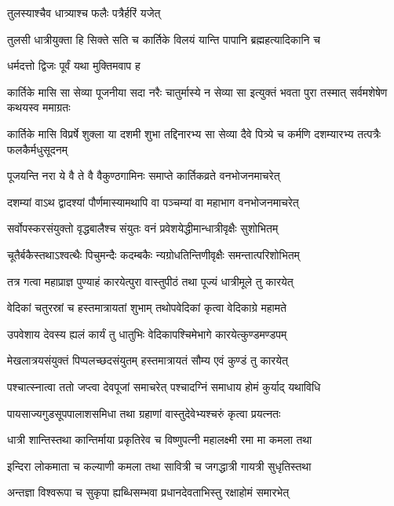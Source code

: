\onelineshloka
{तुलस्याश्चैव धात्र्याश्च फलैः पत्रैर्हरिं यजेत्} %

\twolineshloka
{तुलसी धात्रीयुक्ता हि सिक्ते सति च कार्तिके}
{विलयं यान्ति पापानि ब्रह्महत्यादिकानि च} %


\onelineshloka
{धर्मदत्तो द्विजः पूर्वं यथा मुक्तिमवाप ह} %


\threelineshloka
{कार्तिके मासि सा सेव्या पूजनीया सदा नरैः}
{चातुर्मास्ये न सेव्या सा इत्युक्तं भवता पुरा}
{तस्मात् सर्वमशेषेण कथयस्व ममाग्रतः} %


\threelineshloka
{कार्तिके मासि विप्रर्षे शुक्ला या दशमी शुभा}
{तद्दिनारभ्य सा सेव्या दैवे पित्र्ये च कर्मणि}
{दशम्यारभ्य तत्पत्रैः फलकैर्मधुसूदनम्} %

\twolineshloka
{पूजयन्ति नरा ये वै ते वै वैकुण्ठगामिनः}
{समाप्ते कार्तिकव्रते वनभोजनमाचरेत्} %

\twolineshloka
{दशम्यां वाऽथ द्वादश्यां पौर्णमास्यामथापि वा}
{पञ्चम्यां वा महाभाग वनभोजनमाचरेत्} %

\twolineshloka
{सर्वोपस्करसंयुक्तो वृद्धबालैश्च संयुतः}
{वनं प्रवेशयेद्धीमान्धात्रीवृक्षैः सुशोभितम्} %

\twolineshloka
{चूतैर्बकैस्तथाऽश्वत्थैः पिचुमन्दैः कदम्बकैः}
{न्यग्रोधतिन्तिणीवृक्षैः समन्तात्परिशोभितम्} %

\twolineshloka
{तत्र गत्वा महाप्राज्ञ पुण्याहं कारयेत्पुरा}
{वास्तुपीठं तथा पूज्यं धात्रीमूले तु कारयेत्} %

\twolineshloka
{वेदिकां चतुरस्रां च हस्तमात्रायतां शुभाम्}
{तथोपवेदिकां कृत्वा वेदिकाग्रे महामते} %

\twolineshloka
{उपवेशाय देवस्य ह्यलं कार्यं तु धातुभिः}
{वेदिकापश्चिमेभागे कारयेत्कुण्डमण्डपम्} %

\twolineshloka
{मेखलात्रयसंयुक्तं पिप्पलच्छदसंयुतम्}
{हस्तमात्रायतं सौम्य एवं कुण्डं तु कारयेत्} %

\twolineshloka
{पश्चात्स्नात्वा ततो जप्त्वा देवपूजां समाचरेत्}
{पश्चादग्निं समाधाय होमं कुर्याद् यथाविधि} %

\twolineshloka
{पायसाज्यगुडसूपपालाशसमिधा तथा}
{ग्रहाणां वास्तुदेवेभ्यश्चरुं कृत्वा प्रयत्नतः} %

\twolineshloka
{धात्री शान्तिस्तथा कान्तिर्माया प्रकृतिरेव च}
{विष्णुपत्नी महालक्ष्मी रमा मा कमला तथा} %

\twolineshloka
{इन्दिरा लोकमाता च कल्याणी कमला तथा}
{सावित्री च जगद्धात्री गायत्री सुधृतिस्तथा} %

\twolineshloka
{अन्तज्ञा विश्वरूपा च सुकृपा ह्यब्धिसम्भवा}
{प्रधानदेवताभिस्तु रक्षाहोमं समारभेत्} %


